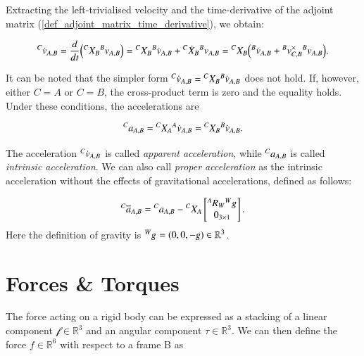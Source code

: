 Extracting the left-trivialised velocity and the time-derivative of the adjoint matrix (\ref{def_adjoint_matrix_time_derivative}), we obtain:

\begin{equation}
    {}^{C}{\dot{v}}_{A,B} = \frac{d}{dt} \Big({}^{C}{X}_{B}{}^{B}{v}_{A,B} \Big) = {}^{C}{X}_{B}{}^{B}{\dot{v}}_{A,B} + {}^{C}{\dot{X}}_{B}{}^{B}{v}_{A,B} = {}^{C}{X}_{B} \Big( {}^{B}{\dot{v}}_{A,B} + {}^{B}{v}_{C,B}^{\times}{}^{B}{v}_{A,B} \Big).
\end{equation}

It can be noted that the simpler form ${}^{C}{\dot{v}}_{A,B} = {}^{C}{X}_{B}{}^{B}{\dot{v}}_{A,B}$ does not hold. If, however, either $C = A$ or $C = B$, the cross-product term is zero and the equality holds.
Under these conditions, the accelerations are

\begin{equation}
    {}^{C}{a}_{A,B} = {}^{C}{X}_{A}{}^{A}{\dot{v}}_{A,B} = {}^{C}{X}_{B}{}^{B}{\dot{v}}_{A,B}.
\end{equation}

The acceleration ${}^{C}{\dot{v}}_{A,B}$ is called \textit{apparent acceleration}, while ${}^{C}{a}_{A,B}$ is called \textit{intrinsic acceleration}.
We can also call \textit{proper acceleration} as the intrinsic acceleration without the effects of gravitational accelerations, defined as follows:

\begin{equation} \label{def_proper_acceleration}
    {}^{C}{\overline{a}}_{A,B} = {}^{C}{a}_{A,B} - {}^{C}{X}_{A}\begin{bmatrix}
        {}^{A}{R}_{W}{}^{W}{g}_{}\\
        0_{3 \times 1}
    \end{bmatrix}.
\end{equation}
Here the definition of gravity is ${}^{W}{g}_{} = (0, 0, -g) \in \mathbb{R}^3$.

\section{Forces \& Torques}
The force acting on a rigid body can be expressed as a stacking of a linear component $\mathcal{f} \in \mathbb{R}^3$ and an angular component $\mathcal{\tau} \in \mathbb{R}^3$. We can then define the force $f \in \mathbb{R}^6$ with respect to a frame B as

